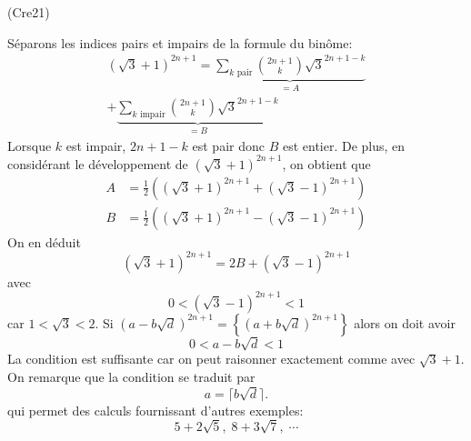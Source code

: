 \begin{tiny}(Cre21)\end{tiny} Séparons les indices pairs et impairs de la formule du binôme:
\begin{multline*}
 (\sqrt{3}+1)^{2n+1}= \underset{= A}{\underbrace{\sum_{k \text{ pair}}\binom{2n+1}{k}\sqrt{3}^{2n+1-k}}}\\
 + \underset{= B}{\underbrace{\sum_{k \text{ impair}}\binom{2n+1}{k}\sqrt{3}^{2n+1-k}}}
\end{multline*}
Lorsque $k$ est impair, $2n+1-k$ est pair donc $B$ est entier. De plus, en considérant le développement de $(\sqrt{3}+1)^{2n+1}$, on obtient que 
\begin{align*}
 A &= \frac{1}{2}\left((\sqrt{3}+1)^{2n+1} + (\sqrt{3}-1)^{2n+1} \right) \\
 B &= \frac{1}{2}\left((\sqrt{3}+1)^{2n+1} - (\sqrt{3}-1)^{2n+1} \right)
\end{align*}
On en déduit
\begin{displaymath}
 (\sqrt{3}+1)^{2n+1}= 2B + (\sqrt{3}-1)^{2n+1}
\end{displaymath}
avec 
\begin{displaymath}
 0 < (\sqrt{3}-1)^{2n+1} < 1
\end{displaymath}
car $1< \sqrt{3} < 2$.\newline
Si $(a-b\sqrt{d})^{2n+1} = \left\lbrace (a+b\sqrt{d})^{2n+1} \right\rbrace $ alors on doit avoir
\[
 0 < a-b\sqrt{d} <1
\]
La condition est suffisante car on peut raisonner exactement comme avec $\sqrt{3}+1$. On remarque que la condition se traduit par 
\[
 a = \lceil b\sqrt{d} \rceil.
\]
qui permet des calculs fournissant d'autres exemples:
\[
 5+2\sqrt{5}, \;8+3\sqrt{7}, \; \cdots
\]
